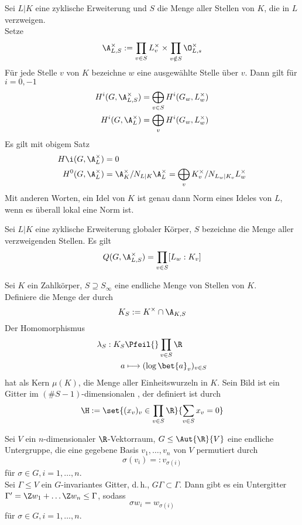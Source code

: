 \Satz{}
Sei $L|K$ eine zyklische Erweiterung und $S$ die Menge aller Stellen von $K$, die in $L$ verzweigen.\\
Setze
\[ \A_{L,S}^\times := \prod_{v\in S}L_v^\times \times \prod_{v\notin S} \O_{L,s}^\times \]
Für jede Stelle $v$ von $K$ bezeichne $w$ eine ausgewählte Stelle über $v$. Dann gilt für $i = 0,-1$
\begin{align*}
H^i(G, \A_{L,S}^\times ) &= \bigoplus_{v\in S}H^i(G_w, L_w^\times)\\
H^i(G, \A_{L}^\times ) &= \bigoplus_{v}H^i(G_w, L_w^\times)\\
\end{align*}
\Bem{}
Es gilt mit obigem Satz
\begin{align*}
H\i (G, \A_L^\times) &= 0\\
H^0(G,\A_L^\times) &= \A_K^\times/N_{L|K}\A_L^\times = \bigoplus_{v} K_v^\times / N_{L_w|K_v}L_w^\times
\end{align*}
Mit anderen Worten, ein Idel von $K$ ist genau dann Norm eines Ideles von $L$, wenn es überall lokal eine Norm ist.

\Satz{}
Sei $L|K$ eine zyklische Erweiterung globaler Körper, $S$ bezeichne die Menge aller verzweigenden Stellen. Es gilt
\[ Q(G, \A_{L,S}^\times) = \prod_{v\in S} [L_w:K_v] \]

\Satz{}
Sei $K$ ein Zahlkörper, $S \supseteq S_\infty$ eine endliche Menge von Stellen von $K$.\\
Definiere die Menge der  durch
\[ K_S := K^\times \cap \A_{K,S} \]
Der Homomorphismus
\begin{align*}
\lambda_S : K_S &\Pfeil{} \prod_{v\in S} \R\\
a & \longmapsto (\log \bet{a}_v)_{v\in S} 
\end{align*}
hat als Kern $\mu(K)$, die Menge aller Einheitswurzeln in $K$. Sein Bild ist ein Gitter im $(\#S-1)$-dimensionalen , der definiert ist durch
\[ \H:= \set{(x_v)_v \in \prod_{v\in S}\R }{\sum_{v\in S}x_v = 0} \]

\Lem{}
Sei $V$ ein $n$-dimensionaler $\R$-Vektorraum, $G \leq \Aut{\R}{V}$ eine endliche Untergruppe, die eine gegebene Basis $v_1,\ldots,v_n$ von $V$ permutiert durch
\[ \sigma(v_i) =: v_{\sigma(i)} \]
für $\sigma \in G, i = 1,\ldots,n$.\\
Sei $\Gamma \leq V$ ein $G$-invariantes Gitter, d.\,h., $G\Gamma \subset \Gamma$. Dann gibt es ein Untergitter $\Gamma' = \Z w_1 + \ldots \Z w_n \leq \Gamma$, sodass
\[ \sigma w_i = w_{\sigma(i)} \]
für $\sigma \in G, i = 1,\ldots,n$.

